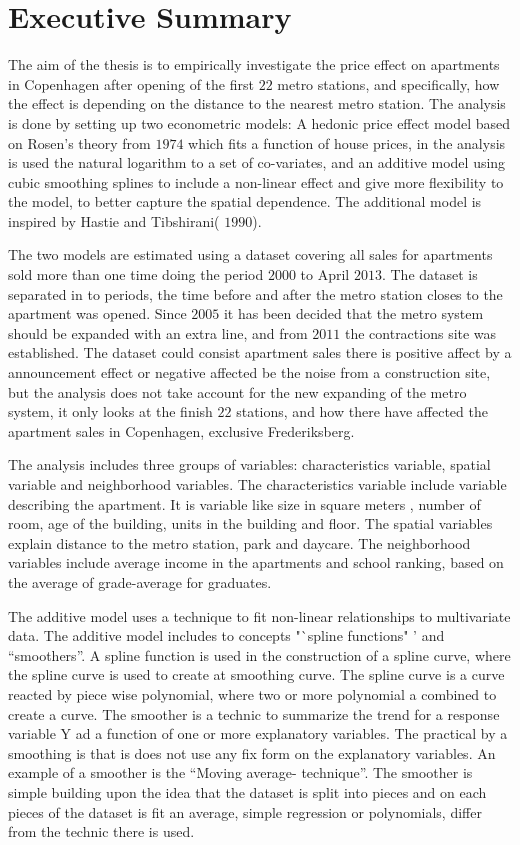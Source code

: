 \section{Executive Summary}
The aim of the thesis is to empirically investigate the price effect on 
apartments in Copenhagen after opening of the first $22$ metro stations, and 
specifically, how the effect is depending on the distance to the nearest 
metro station. The analysis is done by setting up two econometric models:  A 
hedonic price effect model based on Rosen's theory from $1974$ which fits a 
function of house prices, in the analysis is used the natural logarithm to a 
set of co-variates,  and an additive model using cubic smoothing splines to 
include a non-linear effect and give more flexibility to the model, to better 
capture the spatial dependence. The additional model is inspired by Hastie and 
Tibshirani( $1990$). 

The two models are estimated using a dataset covering all sales for 
apartments sold more than one time doing the period $2000$ to April $2013$. The 
dataset is separated in to periods, the time before and after the metro 
station closes to the apartment was opened. Since $2005$ it has been decided 
that the metro system should be expanded with an extra line, and from $2011$ 
the contractions site was established. The dataset could consist apartment 
sales there is positive affect by a announcement effect or negative affected 
be the noise from a construction site, but the analysis does not take account 
for the new expanding of the metro system, it only looks at  the finish $22$ 
stations, and how there have affected the apartment sales in Copenhagen, 
exclusive Frederiksberg. 

The analysis includes three groups of variables: characteristics variable, 
spatial variable and neighborhood variables. The characteristics variable 
include variable describing the apartment. It is variable like size in square 
meters , number of room, age of the building, units in the building and 
floor. The spatial variables explain distance to the metro station, park and 
daycare. The neighborhood variables include average income in the apartments 
and school ranking, based on the average of grade-average for graduates. 

The additive model uses a technique to fit non-linear relationships to 
multivariate data. The additive model includes to concepts "`spline functions"
' and "`smoothers"'.  A spline function is used in the construction of a 
spline curve, where the spline curve is used to create at smoothing curve.  
The spline curve is a curve reacted by piece wise polynomial, where two or 
more polynomial a combined to create a curve. The smoother is a technic to 
summarize the trend for a response variable Y ad a function of one or more 
explanatory variables. The practical by a smoothing is that is does not use 
any fix form on the explanatory variables.  An example of a smoother is the 
"`Moving average- technique"'. The smoother is simple building upon the idea 
that the dataset is split into pieces and on each pieces of the dataset is 
fit an average,  simple regression or polynomials, differ from the technic 
there is used.  

